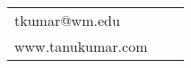 \documentclass[letterpaper, 10pt]{article}
\begin{document}


\vspace{0.3cm} 
\begin{center}
\begin{tabular}{lll}
 tkumar@wm.edu      &
\hspace{3.7in}     &
\hspace{3.7in} 	 \\


www.tanukumar.com  & 
\hspace{3.7in}  & 
\hspace{3.7in} \end{tabular}
\end{center}


\setlength{\tabcolsep}{8pt}
\end{document}

